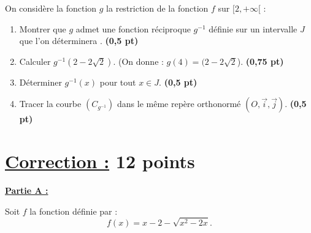 \documentclass[12pt,a4paper]{article}
\begin{document}
\begin{enumerate}
On considère la fonction \( g \) la restriction de la fonction \( f \) sur \( [2, +\infty[ \) :

\begin{enumerate}
    \item Montrer que \( g \) admet une fonction réciproque \( g^{-1} \) définie sur un intervalle \( J \)\\ que l’on déterminera . \hspace{1cm} \textbf{(0,5 pt)}
    
    \item Calculer \( g^{-1}(2 - 2\sqrt{2}) \). (On donne : \( g(4) = (2 - 2\sqrt{2} \)). \hspace{1cm} \textbf{(0,75 pt)}
    
    \item Déterminer \( g^{-1}(x) \) pour tout \( x \in J \). \hspace{3cm} \textbf{(0,5 pt)}
    
    \item Tracer la courbe \( (C_{g^{-1}}) \) dans le même repère orthonormé \( (O, \vec{i}, \vec{j}) \). \hspace{2cm} \textbf{(0,5 pt)}
\end{enumerate}

\end{enumerate}
\section*{\underline{Correction :} 12 points}
\underline{\textbf{Partie A :}}

Soit \( f \) la fonction définie par :
\[
f(x) = x - 2 - \sqrt{x^2 - 2x}.
\]
\end{document}
